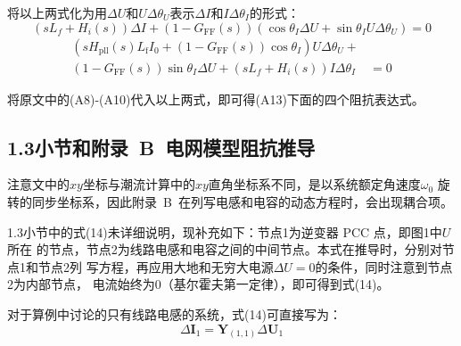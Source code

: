 \documentclass[12pt, a4paper, UTF8, fontset=adobe, scheme=chinese, heading=true, oneside]{ctexbook} %
\begin{document}
将以上两式化为用$\Delta U$和$U\Delta\theta_U$表示$\Delta I$和$I\Delta\theta_I$的形式：
\begin{equation}
  (sL_f+H_i(s))\Delta I + (1-G_{\mathrm{FF}}(s))(\cos\theta_I\Delta U + \sin\theta_I U\Delta\theta_U) = 0
\end{equation}
\begin{equation}
\begin{split}
  \left(s H_{\mathrm{pll}}(s)L_{\mathrm{f}}I_0 + (1-G_{\mathrm{FF}}(s))\cos\theta_I \right) U \Delta \theta_U + & \\
  (1-G_{\mathrm{FF}}(s))\sin\theta_I\Delta U + (sL_f+H_i(s))I\Delta\theta_I &= 0 
\end{split}
\end{equation}

将原文中的(A8)-(A10)代入以上两式，即可得(A13)下面的四个阻抗表达式。

\subsection{1.3小节和附录~B~电网模型阻抗推导}
注意文中的$xy$坐标与潮流计算中的$xy$直角坐标系不同，是以系统额定角速度$\omega_0$
旋转的同步坐标系，因此附录~B~在列写电感和电容的动态方程时，会出现耦合项。

1.3小节中的式(14)未详细说明，现补充如下：节点1为逆变器 PCC 点，即图1中$U$所在
的节点，节点2为线路电感和电容之间的中间节点。本式在推导时，分别对节点1和节点2列
写方程，再应用大地和无穷大电源$\Delta U = 0$的条件，同时注意到节点2为内部节点，
电流始终为0（基尔霍夫第一定律），即可得到式(14)。

对于算例中讨论的只有线路电感的系统，式(14)可直接写为：
\begin{equation}
  \Delta \bm{I}_1 = \bm{Y}_{(1,1)} \Delta \bm{U}_1
\end{equation}



\end{document}

